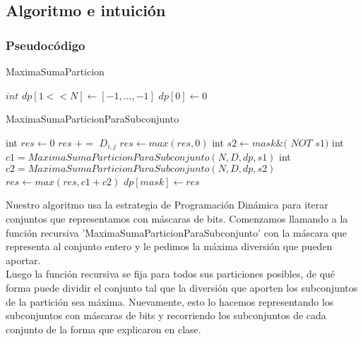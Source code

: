 \subsection{Algoritmo e intuición}

\subsubsection{Pseudocódigo}

\begin{algorithm}[H]
    \caption{MaximaSumaParticion}
    $int$  $\mathit{dp[1<<N]} \gets [-1,...,-1]$ \;
    $\mathit{dp[0]} \gets 0$ \;
\end{algorithm}

\begin{algorithm}[H]
    \caption{MaximaSumaParticionParaSubconjunto}
     {
    }{
    int $\mathit{res} \gets 0$ \;
     {
         {
             {
                $res$ $+=$ $D_{i,j}$
            }
        }
    }
    $res \gets max(res, 0)$ \;
     {
        int $s2 \gets mask \& ($ $NOT$ $ s1)$ \;
        int $c1 = MaximaSumaParticionParaSubconjunto(N, D, dp, s1)$ \;
        int $c2 = MaximaSumaParticionParaSubconjunto(N, D, dp, s2)$ \;
        $res \gets max(res, c1+c2)$ \;
    }
    $dp[mask] \gets res$ \;
    }
\end{algorithm}
\bigskip

Nuestro algoritmo usa la estrategia de Programación Dinámica para iterar conjuntos que representamos con máscaras de bits. Comenzamos llamando a la función recursiva 'MaximaSumaParticionParaSubconjunto' con la máscara que representa al conjunto entero y le pedimos la máxima diversión que pueden aportar. \\
Luego la función recursiva se fija para todos sus particiones posibles, de qué forma puede dividir el conjunto tal que la diversión que aporten los subconjuntos de la partición sea máxima. Nuevamente, esto lo hacemos representando los subconjuntos con máscaras de bits y recorriendo los subconjuntos de cada conjunto de la forma que explicaron en clase.

